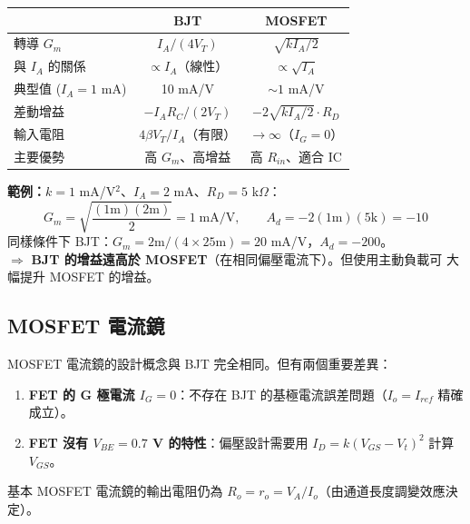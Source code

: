 \documentclass[12pt]{article}
\begin{document}
\begin{center}\small
\begin{tabular}{p{3.2cm}|c|c}
\toprule
 & \textbf{BJT} & \textbf{MOSFET} \\
\midrule
轉導 $G_m$ & $I_A/(4V_T)$ & $\sqrt{kI_A/2}$ \\
與 $I_A$ 的關係 & $\propto I_A$（線性） & $\propto \sqrt{I_A}$ \\
典型值 ($I_A{=}1$ mA) & 10 mA/V & $\sim 1$ mA/V \\
差動增益 & $-I_AR_C/(2V_T)$ & $-2\sqrt{kI_A/2}\cdot R_D$ \\
輸入電阻 & $4\beta V_T/I_A$（有限） & $\to \infty$（$I_G = 0$） \\
主要優勢 & 高 $G_m$、高增益 & 高 $R_{in}$、適合 IC \\
\bottomrule
\end{tabular}
\end{center}

\noindent\textbf{範例：}$k = 1$ mA/V$^2$、$I_A = 2$ mA、$R_D = 5$ k$\Omega$：
\[
  G_m = \sqrt{\frac{(1\text{m})(2\text{m})}{2}} = 1\;\text{mA/V}, \qquad A_d = -2(1\text{m})(5\text{k}) = -10
\]
同樣條件下 BJT：$G_m = 2\text{m}/(4\times25\text{m}) = 20$ mA/V，$A_d = -200$。\\
$\Rightarrow$ \textbf{BJT 的增益遠高於 MOSFET}（在相同偏壓電流下）。但使用主動負載可
大幅提升 MOSFET 的增益。

\subsection*{MOSFET 電流鏡}


MOSFET 電流鏡的設計概念與 BJT 完全相同。但有兩個重要差異：

\begin{enumerate}[leftmargin=2em]
  \item \textbf{FET 的 G 極電流 $I_G = 0$}：不存在 BJT 的基極電流誤差問題（$I_o = I_{ref}$
        精確成立）。
  \item \textbf{FET 沒有 $V_{BE} = 0.7$ V 的特性}：偏壓設計需要用 $I_D = k(V_{GS}-V_t)^2$ 計算
        $V_{GS}$。
\end{enumerate}

\noindent 基本 MOSFET 電流鏡的輸出電阻仍為 $R_o = r_o = V_A/I_o$（由通道長度調變效應決定）。

\end{document}

